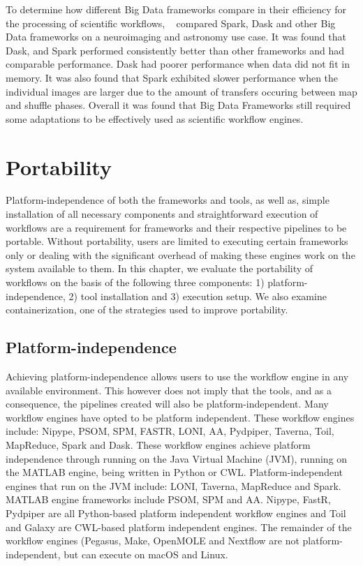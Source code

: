             To determine how different Big Data frameworks compare in their
            efficiency for the processing of scientific workflows,
            ~\cite{mehta2017comparative} compared Spark, Dask and other Big Data
            frameworks on a neuroimaging and astronomy use case. It was found
            that Dask, and Spark performed consistently better than other
            frameworks and had comparable performance. Dask had poorer
            performance when data did not fit in memory. It was also found that
            Spark exhibited slower performance when the individual images are
            larger due to the amount of transfers occuring between map and
            shuffle phases. Overall it was found that Big Data Frameworks still
            required some adaptations to be effectively used as scientific
            workflow engines.            
            
    \section{Portability}\label{portability} Platform-independence of both the
        frameworks and tools, as well as, simple installation of all necessary
        components and straightforward execution of workflows are a requirement
        for frameworks and their respective pipelines to be portable. Without
        portability, users are limited to executing certain frameworks only or
        dealing with the significant overhead of making these engines work on
        the system available to them. In this chapter, we evaluate the
        portability of workflows on the basis of the following three components:
        1) platform-independence, 2) tool installation and 3) execution setup.
        We also examine containerization, one of the strategies used to improve
        portability.

        \subsection{Platform-independence}
            Achieving platform-independence allows users to use the workflow
            engine in any available environment. This however does not imply
            that the tools, and as a consequence, the pipelines created will
            also be platform-independent. Many workflow engines have opted to be
            platform independent. These workflow engines include: Nipype, PSOM,
            SPM, FASTR, LONI, AA, Pydpiper, Taverna, Toil, MapReduce, Spark and
            Dask. These workflow engines achieve platform independence through
            running on the Java Virtual Machine (JVM), running on the MATLAB
            engine, being written in Python or CWL. Platform-independent engines
            that run on the JVM include: LONI, Taverna, MapReduce and Spark.
            MATLAB engine frameworks include PSOM, SPM and AA. Nipype, FastR,
            Pydpiper are all Python-based platform independent workflow engines
            and Toil and Galaxy are CWL-based platform independent engines. The
            remainder of the workflow engines (Pegasus, Make, OpenMOLE and
            Nextflow are not platform-independent, but can execute on macOS and
            Linux.


